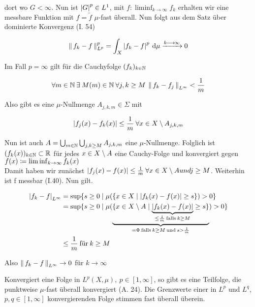 \documentclass[skript.tex]{subfiles}
\begin{document}
\begin{bem}
	dort wo $G< \infty$. Nun ist $\left| G \right|^p \in L^1$, mit $f \colon \liminf_{k \to \infty} f_k$ erhalten wir eine messbare Funktion mit $f = \tilde f$ $\mu$-fast überall. Nun folgt aus dem Satz über dominierte Konvergenz (I. 54)
	
	\begin{equation*}
	\left\lVert\, f_k - f\, \right\rVert_{L^p}^p = \int_X \left| f_k -f \right|^p \: \mathrm{d} \mu \xrightarrow{k\kern -1pt \longrightarrow \kern -1pt\infty} 0
	\end{equation*}
	
	Im Fall $p= \infty$ gilt für die Cauchyfolge $(f_k)_{k\in\mathbb{N}}$ 
	
	\begin{equation*}
	\forall m \in \mathbb{N} \: \exists \: M(m) \in \mathbb{N} \: \forall j,k \geq M \: \left\lVert\, f_k - f_j\, \right\rVert_{L^\infty} < \frac{1}{m}
	\end{equation*}
	
	Also gibt es eine $\mu$-Nullmenge $A_{j,k,m} \in \Sigma$ mit
	
	\begin{equation*}
	\left| f_j(x)- f_k(x) \right| \leq \frac{1}{m} \: \forall x \in X \setminus A_{j,k,m}
	\end{equation*}
	
	Nun ist auch $A = \bigcup_{m\in\mathbb{N}} \bigcup_{j,k \geq M} A_{j,k,m}$ eine $\mu$-Nullmenge.
	Folglich ist $ (f_k(x))_{k\in\mathbb{N}} \subset \mathbb{R}$ für jedes $ x \in X \setminus A$ eine Cauchy-Folge und konvergiert gegen $f(x) \coloneqq \liminf_{k\to\infty} f_k(x)$ \\
	Damit haben wir zunächst $\left| f_j(x) - f(x) \right| \leq \frac{1}{m} \: \forall x \in X \setminus A und j \geq M$. Weiterhin ist f messbar (I.40). Nun gilt.
	
	\begin{align*}
	\left| f_k-f \right|_{L^\infty} &= \sup\{s \geq 0 \mid \mu(\{x\in X \mid \left| f_k(x) - f(x) \right| \geq s \})>0\} \\
	&= \sup\{s \geq 0 \mid \mu( \underbrace{\{x\in X \setminus A \mid \underbrace{\left| f_k(x) - f(x) \right|}_{\leq \frac{1}{m} \: \text{falls} \: k\geq M}  \geq s \}}_{= \Phi \: \text{falls} \: k\geq M \: \text{und} \: s > \frac{1}{m}})>0\} \\
	&\leq \frac{1}{m} \: \text{für} \: k \geq M
	\end{align*}
	
	Also $\left\lVert\, f_k - f\, \right\rVert_{L^\infty} \to 0$ für $ k \to \infty $
\end{bem}

\begin{cor}
	Konvergiert eine Folge in $L^p(X,\mu), \: p \in [ 1,\infty]$, so gibt es eine Teilfolge, die punktweise $\mu$-fast überall konvergiert (A. 24). Die Grenzwerte einer in $L^p$ und $L^q$, $p,q \in [1,\infty]$ konvergierenden Folge stimmen fast überall überein.
\end{cor}
\end{document}
